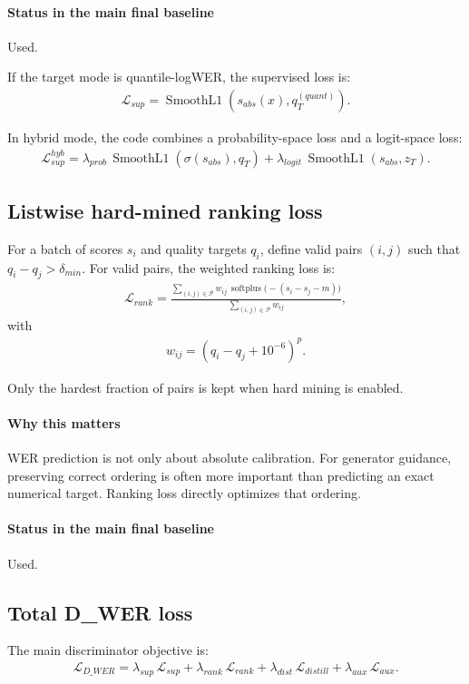 \documentclass[11pt]{article}
\begin{document}
\paragraph{Status in the main final baseline}
Used.

If the target mode is quantile-logWER, the supervised loss is:
\begin{align}
    \mathcal{L}_{sup} = \operatorname{SmoothL1}(s_{abs}(x), q_T^{(quant)}).
\end{align}

In hybrid mode, the code combines a probability-space loss and a logit-space loss:
\begin{align}
    \mathcal{L}_{sup}^{hyb} = \lambda_{prob}\,\operatorname{SmoothL1}(\sigma(s_{abs}), q_T) + \lambda_{logit}\,\operatorname{SmoothL1}(s_{abs}, z_T).
\end{align}

\subsection{Listwise hard-mined ranking loss}
For a batch of scores $s_i$ and quality targets $q_i$, define valid pairs $(i,j)$ such that $q_i - q_j > \delta_{min}$. For valid pairs, the weighted ranking loss is:
\begin{align}
    \mathcal{L}_{rank}
    = \frac{\sum_{(i,j) \in \mathcal{P}} w_{ij}\,\operatorname{softplus}\big(-(s_i - s_j - m)\big)}{\sum_{(i,j) \in \mathcal{P}} w_{ij}},
\end{align}
with
\begin{align}
    w_{ij} = (q_i - q_j + 10^{-6})^{p}.
\end{align}

Only the hardest fraction of pairs is kept when hard mining is enabled.

\paragraph{Why this matters}
WER prediction is not only about absolute calibration. For generator guidance, preserving correct ordering is often more important than predicting an exact numerical target. Ranking loss directly optimizes that ordering.

\paragraph{Status in the main final baseline}
Used.

\subsection{Total D\_WER loss}
The main discriminator objective is:
\begin{align}
    \mathcal{L}_{D\_WER} = \lambda_{sup}\,\mathcal{L}_{sup} + \lambda_{rank}\,\mathcal{L}_{rank} + \lambda_{dist}\,\mathcal{L}_{distill} + \lambda_{aux}\,\mathcal{L}_{aux}.
\end{align}
\end{document}
